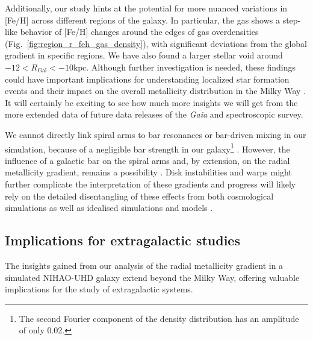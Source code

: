 \documentclass[fleqn,usenatbib]{mnras}
\begin{document}
Additionally, our study hints at the potential for more nuanced variations in [Fe/H] across different regions of the galaxy. In particular, the gas shows a step-like behavior of [Fe/H] changes around the edges of gas overdensities (Fig.~\ref{fig:region_r_feh_gas_density}), with significant deviations from the global gradient in specific regions. We have also found a larger stellar void around $-12 < R_\mathrm{Gal} < -10\mathrm{kpc}$. Although further investigation is needed, these findings could have important implications for understanding localized star formation events and their impact on the overall metallicity distribution in the Milky Way \citep{Sanchez2014, SanchezBlazquez2014, Ho2015}. It will certainly be exciting to see how much more insights \citep{Poggio2021, Hackshaw2024} we will get from the more extended data of future data releases of the \textit{Gaia} and spectroscopic survey.

We cannot directly link spiral arms to bar resonances or bar-driven mixing in our simulation, because of a negligible bar strength in our galaxy\footnote{The second Fourier component of the density distribution has an amplitude of only 0.02.} \citep[but see][]{Minchev2010, DiMatteo2013}. However, the influence of a galactic bar on the spiral arms and, by extension, on the radial metallicity gradient, remains a possibility \citep[see again][]{Chen2023}. Disk instabilities and warps might further complicate the interpretation of these gradients and progress will likely rely on the detailed disentangling of these effects from both cosmological simulations as well as idealised simulations and models \citep{Minchev2013, Grand2015, Grand2016, Krumholz2018, Sharda2021, BlandHawthorn2024, TepperGarcia2024}.

\subsection{Implications for extragalactic studies} \label{sec:implications_extragalactic}

The insights gained from our analysis of the radial metallicity gradient in a simulated NIHAO-UHD galaxy extend beyond the Milky Way, offering valuable implications for the study of extragalactic systems.
\end{document}
